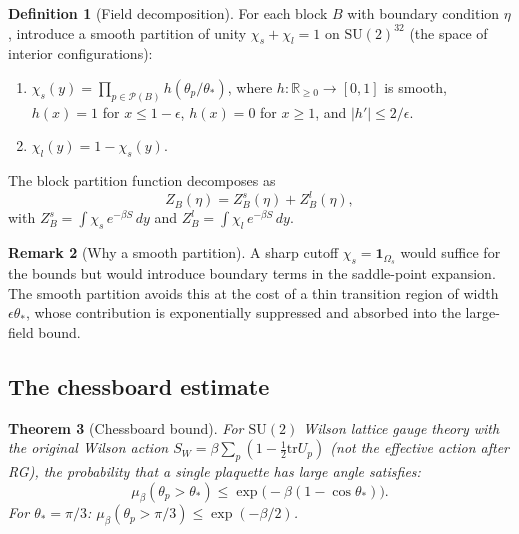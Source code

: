 \documentclass[11pt]{article}
\newtheorem{theorem}{Theorem}[section]
\theoremstyle{definition}
\newtheorem{definition}[theorem]{Definition}
\newtheorem{remark}[theorem]{Remark}
\newcommand{\SU}{\mathrm{SU}}
\newcommand{\tr}{\mathrm{tr}}
\newcommand{\R}{\mathbb{R}}
\begin{document}
\begin{definition}[Field decomposition]\label{def:decomp}
For each block $B$ with boundary condition $\eta$, introduce a smooth
partition of unity $\chi_s+\chi_l=1$ on $\SU(2)^{32}$ (the space of
interior configurations):
\begin{enumerate}[nosep,label=(\roman*)]
\item $\chi_s(y)=\prod_{p\in\mathcal{P}(B)}h(\theta_p/\theta_*)$,
where $h:\R_{\ge 0}\to[0,1]$ is smooth, $h(x)=1$ for $x\le 1-\epsilon$,
$h(x)=0$ for $x\ge 1$, and $|h'|\le 2/\epsilon$.
\item $\chi_l(y)=1-\chi_s(y)$.
\end{enumerate}
The block partition function decomposes as
\begin{equation}\label{eq:Z-decomp}
Z_B(\eta)=Z_B^s(\eta)+Z_B^l(\eta),
\end{equation}
with $Z_B^s=\int\chi_s\,e^{-\beta S}\,dy$ and
$Z_B^l=\int\chi_l\,e^{-\beta S}\,dy$.
\end{definition}

\begin{remark}[Why a smooth partition]
A sharp cutoff $\chi_s=\mathbf{1}_{\Omega_s}$ would suffice for the
bounds but would introduce boundary terms in the saddle-point expansion.
The smooth partition avoids this at the cost of a thin transition region
of width $\epsilon\theta_*$, whose contribution is exponentially
suppressed and absorbed into the large-field bound.
\end{remark}

\subsection{The chessboard estimate}

\begin{theorem}[Chessboard bound]\label{thm:chess}
For $\SU(2)$ Wilson lattice gauge theory with the original
Wilson action $S_W=\beta\sum_p(1-\frac{1}{2}\tr U_p)$
(not the effective action after RG), the probability that a single
plaquette has large angle satisfies:
\begin{equation}\label{eq:chess}
\mu_\beta(\theta_p>\theta_*)
\le\exp\bigl(-\beta(1-\cos\theta_*)\bigr).
\end{equation}
For $\theta_*=\pi/3$: $\mu_\beta(\theta_p>\pi/3)
\le\exp(-\beta/2)$.
\end{theorem}
\end{document}
